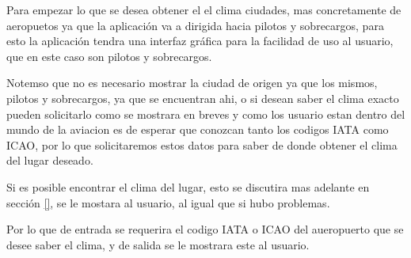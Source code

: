 Para empezar lo que se desea obtener el el clima ciudades, mas concretamente de aeropuetos ya que
la aplicación va a dirigida hacia pilotos y sobrecargos, para esto la aplicación tendra una interfaz gráfica
para la facilidad de uso al usuario, que en este caso son pilotos y sobrecargos.

Notemso que no es necesario mostrar la ciudad de origen ya que los mismos, pilotos y sobrecargos, ya que se encuentran ahi, o si
desean saber el clima exacto pueden solicitarlo como se mostrara en breves y como los usuario estan dentro del mundo de la aviacion
es de esperar que conozcan tanto los codigos IATA como ICAO, por lo que solicitaremos estos datos para saber de donde obtener el clima
del lugar deseado.

Si es posible encontrar el clima del lugar, esto se discutira mas adelante en sección \ref{}, se le mostara al usuario, al igual que si hubo problemas.

Por lo que de entrada se requerira el codigo IATA o ICAO del aueropuerto que se desee saber el clima, y de salida se le mostrara este al usuario.
